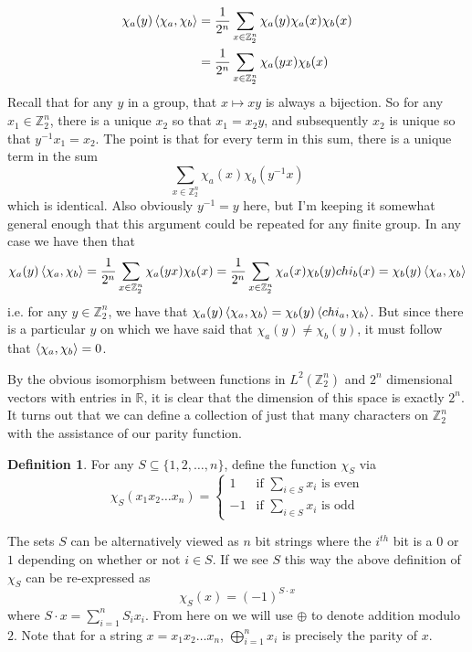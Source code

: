 \documentclass{article}
\theoremstyle{definition}
\newtheorem{definition}{Definition}[section]
\theoremstyle{plain}
\theoremstyle{theorem}
\begin{document}
\begin{align}
	 \chi_a(y)\braket{\chi_a,\chi_b} &= \frac{1}{2^n}\sum_{x \in \mathbb{Z}_2^n} \chi_a(y)\chi_a(x)\chi_b(x) \\
	 &= \frac{1}{2^n}\sum_{x \in \mathbb{Z}_2^n} \chi_a(yx)\chi_b(x)
\end{align}
Recall that for any $y$ in a group, that $x \mapsto xy$ is always a bijection. So for any $x_1 \in \mathbb{Z}_2^n$, there is a unique $x_2$ so that $x_1 = x_2y$, and subsequently $x_2$ is unique so that $y^{-1}x_1 = x_2$. The point is that for every term in this sum, there is a unique term in the sum
\[ \sum_{x \in \mathbb{Z}_2^n} \chi_a(x)\chi_b(y^{-1}x) \]
which is identical. Also obviously $y^{-1} = y$ here, but I'm keeping it somewhat general enough that this argument could be repeated for any finite group. In any case we have then that 
\[ \chi_a(y)\braket{\chi_a,\chi_b} = \frac{1}{2^n}\sum_{x \in \mathbb{Z}_2^n} \chi_a(yx)\chi_b(x) = \frac{1}{2^n}\sum_{x \in \mathbb{Z}_2^n} \chi_a(x)\chi_b(y)chi_b(x) = \chi_b(y)\braket{\chi_a,\chi_b} \]
i.e. for any $y \in \mathbb{Z}_2^n$, we have that $\chi_a(y)\braket{\chi_a,\chi_b} = \chi_b(y)\braket{chi_a,\chi_b}$. But since there is a particular $y$ on which we have said that $\chi_a(y) \neq \chi_b(y)$, it must follow that $\braket{\chi_a,\chi_b} = 0$. \par 
By the obvious isomorphism between functions in $L^2(\mathbb{Z}_2^n)$ and $2^n$ dimensional vectors with entries in $\mathbb{R}$, it is clear that the dimension of this space is exactly $2^n$. It turns out that we can define a collection of just that many characters on $\mathbb{Z}_2^n$ with the assistance of our parity function. 
\begin{definition}
	For any $S \subseteq \{1,2,\ldots,n\}$, define the function $\chi_S$ via 
	\[ \chi_S(x_1x_2\ldots x_n) = \begin{cases} 1 & \textrm{if } \sum_{i \in S} x_i \textrm{ is even} \\
	-1 & \textrm{if } \sum_{i \in S} x_i \textrm{ is odd} \end{cases}
	 \]
	
\end{definition}
The sets $S$ can be alternatively viewed as $n$ bit strings where the $i^{th}$ bit is a $0$ or $1$ depending on whether or not $i \in S$. If we see $S$ this way the above definition of $\chi_S$ can be re-expressed as 
\[ \chi_S(x) = (-1)^{S \cdot x} \]
where $S \cdot x = \sum_{i=1}^n S_i x_i$.  
From here on we will use $\oplus$ to denote addition modulo $2$. Note that for a string $x = x_1x_2\ldots x_n$, $\bigoplus_{i=1}^n x_i$ is precisely the parity of $x$. \par 
\end{document}
